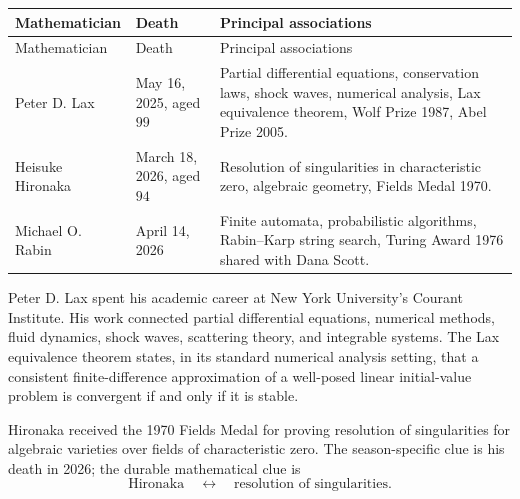     \vspace{1em}

    {\small
    \renewcommand{\arraystretch}{1.18}
    \begin{longtable}{@{}L{0.21\textwidth}L{0.18\textwidth}L{0.45\textwidth}@{}}
        \toprule
        Mathematician & Death & Principal associations \\
        \midrule
        \endfirsthead

        \toprule
        Mathematician & Death & Principal associations \\
        \midrule
        \endhead

        \bottomrule
        \endlastfoot

        Peter D. Lax
        & May 16, 2025, aged $99$
        & Partial differential equations, conservation laws, shock waves,
          numerical analysis, Lax equivalence theorem, Wolf Prize 1987, Abel Prize 2005. \\

        Heisuke Hironaka
        & March 18, 2026, aged $94$
        & Resolution of singularities in characteristic zero, algebraic geometry,
          Fields Medal 1970. \\

        Michael O. Rabin
        & April 14, 2026
        & Finite automata, probabilistic algorithms, Rabin--Karp string search,
          Turing Award 1976 shared with Dana Scott. \\
    \end{longtable}
    }

    \begin{fact}
        \par\noindent
        Peter D. Lax spent his academic career at New York University's Courant
        Institute. His work connected partial differential equations, numerical
        methods, fluid dynamics, shock waves, scattering theory, and integrable
        systems. The Lax equivalence theorem states, in its standard numerical
        analysis setting, that a consistent finite-difference approximation of
        a well-posed linear initial-value problem is convergent if and only if it
        is stable.
    \end{fact}

    \begin{fact}
        Hironaka received the 1970 Fields Medal for proving resolution of
        singularities for algebraic varieties over fields of characteristic
        zero. The season-specific clue is his death in 2026; the durable
        mathematical clue is
        \[
            \text{Hironaka}
            \quad\longleftrightarrow\quad
            \text{resolution of singularities}.
        \]
    \end{fact}

